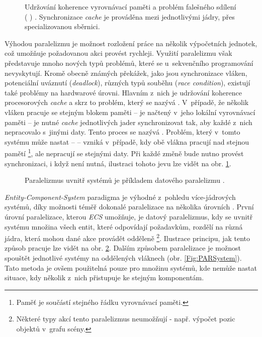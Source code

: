 \begin{figure}[H]
	\centering
	\caption{Udržování koherence vyrovnávací paměti a problém falešného sdílení ( \cite{FalseSharing}) . Synchronizace \emph{cache} je prováděna mezi jednotlivými jádry, přes specializovanou sběrnici.}
	\label{Fig:PARFalseSharing}
\end{figure}

Výhodou paralelizmu je možnost rozložení práce na několik výpočetních jednotek, což umožňuje požadovanou akci provést rychleji. Využití paralelizmu však představuje mnoho nových typů problémů, které se u~sekvenčního programování nevyskytují. Kromě obecně známých překážek, jako jsou synchronizace vláken, potenciální uváznutí (\emph{deadlock}), různých typů souběhu (\emph{race condition}), existují také problémy na hardwarové úrovni. Hlavním z~nich je udržování koherence procesorových \emph{cache} \cite{CacheCoherence} a skrz to problém, který se nazývá  \cite{FalseSharing}. V~případě, že několik vláken pracuje se stejným blokem paměti -- je načtený v~jeho lokální vyrovnávací paměti -- je nutné \emph{cache} jednotlivých jader synchronizovat tak, aby každé z~nich nepracovalo s~jinými daty. Tento proces se nazývá . Problém, který v~tomto systému může nastat --  -- vzniká v~případě, kdy obě vlákna pracují nad stejnou pamětí \footnote{Paměť je součástí stejného řádku vyrovnávací paměti.}, ale nepracují se stejnými daty. Při každé změně bude nutno provést synchronizaci, i když není nutná, ilustraci tohoto jevu lze vidět na obr. \ref{Fig:PARFalseSharing}.

\begin{figure}[H]
	\centering
	\caption{Paralelizmus uvnitř systémů je příkladem datového paralelizmu \cite{KindsOfParallelism}.}
	\label{Fig:PARData}
\end{figure}

\emph{Entity-Component-System} paradigma je výhodné z~pohledu více-jádrových systémů, díky možnosti téměř \cite{AmdahlLaw} dokonalé paralelizace na několika úrovních \cite{ParallelGame}. První úrovní paralelizace, kterou \emph{ECS} umožňuje, je datový paralelizmus, kdy se uvnitř systému množina všech entit, které odpovídají požadavkům, rozdělí na různá jádra, která mohou dané akce provádět odděleně \footnote{Některé typy akcí tento paralelizmus neumožňují - např. výpočet pozic objektů v~grafu scény.}. Ilustrace principu, jak tento způsob pracuje lze vidět na obr. \ref{Fig:PARData}. Dalším způsobem paralelizace je možnost spouštět jednotlivé systémy na oddělených vláknech (obr. \ref{Fig:PARSystem}). Tato metoda je ovšem použitelná pouze pro množinu systémů, kde nemůže nastat situace, kdy několik z~nich přistupuje ke stejným komponentám.


